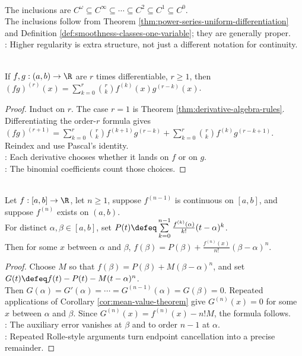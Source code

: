 \begin{perspective} \label{per:regularity-hierarchy-one-variable} \\
The inclusions are $C^\omega\subseteq C^\infty\subseteq \cdots \subseteq C^2\subseteq C^1\subseteq C^0$.\\
The inclusions follow from Theorem \ref{thm:power-series-uniform-differentiation} and Definition \ref{def:smoothness-classes-one-variable}; they are generally proper.\\
: Higher regularity is extra structure, not just a different notation for continuity.
\end{perspective}

\begin{theorem} \label{thm:higher-order-leibniz-product-rule} \\
If $f,g:(a,b)\to\R$ are $r$ times differentiable, $r\geq1$, then $(fg)^{(r)}(x)=\sum\limits_{k=0}^{r}\binom{r}{k}f^{(k)}(x)g^{(r-k)}(x)$.
\begin{proof}
Induct on $r$. The case $r=1$ is Theorem \ref{thm:derivative-algebra-rules}.\\
Differentiating the order-$r$ formula gives $(fg)^{(r+1)} =\sum\limits_{k=0}^{r}\binom{r}{k}f^{(k+1)}g^{(r-k)} + \sum\limits_{k=0}^{r}\binom{r}{k}f^{(k)}g^{(r-k+1)}$.\\
Reindex and use Pascal's identity.\\
: Each derivative chooses whether it lands on $f$ or on $g$.\\
: The binomial coefficients count those choices.
\end{proof}
\end{theorem}

\begin{theorem} \label{thm:taylor-theorem-lagrange-remainder} \\
Let $f:[a,b]\to\R$, let $n\geq1$, suppose $f^{(n-1)}$ is continuous on $[a,b]$, and suppose $f^{(n)}$ exists on $(a,b)$.\\
For distinct $\alpha,\beta\in[a,b]$, set $P(t)\defeq\sum\limits_{k=0}^{n-1}\frac{f^{(k)}(\alpha)}{k!}(t-\alpha)^k$.\\
Then for some $x$ between $\alpha$ and $\beta$, $f(\beta)=P(\beta)+\frac{f^{(n)}(x)}{n!}(\beta-\alpha)^n$.
\begin{proof}
Choose $M$ so that $f(\beta)=P(\beta)+M(\beta-\alpha)^n$, and set $G(t)\defeq f(t)-P(t)-M(t-\alpha)^n$.\\
Then $G(\alpha)=G'(\alpha)=\cdots=G^{(n-1)}(\alpha)=G(\beta)=0$. Repeated applications of Corollary \ref{cor:mean-value-theorem} give $G^{(n)}(x)=0$ for some $x$ between $\alpha$ and $\beta$. Since $G^{(n)}(x)=f^{(n)}(x)-n!M$, the formula follows.\\
: The auxiliary error vanishes at $\beta$ and to order $n-1$ at $\alpha$.\\
: Repeated Rolle-style arguments turn endpoint cancellation into a precise remainder.
\end{proof}
\end{theorem}


